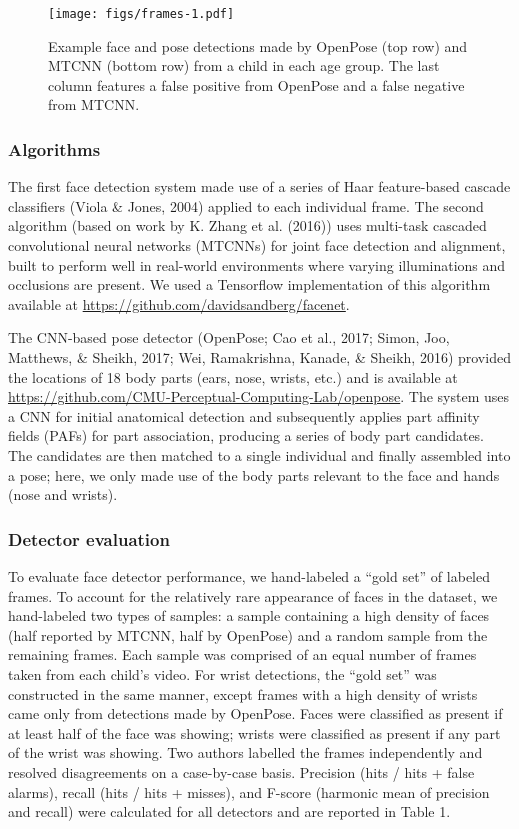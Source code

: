 \documentclass[english,man]{apa6}
\begin{document}
\begin{figure}[htbp]
\centering
\texttt{[image: figs/frames-1.pdf]}
\caption{\label{fig:frames}Example face and pose detections made by OpenPose
(top row) and MTCNN (bottom row) from a child in each age group. The
last column features a false positive from OpenPose and a false negative
from MTCNN.}
\end{figure}

\subsubsection{Algorithms}\label{algorithms}

The first face detection system made use of a series of Haar
feature-based cascade classifiers (Viola \& Jones, 2004) applied to each
individual frame. The second algorithm (based on work by K. Zhang et al.
(2016)) uses multi-task cascaded convolutional neural networks (MTCNNs)
for joint face detection and alignment, built to perform well in
real-world environments where varying illuminations and occlusions are
present. We used a Tensorflow implementation of this algorithm available
at \url{https://github.com/davidsandberg/facenet}.

The CNN-based pose detector (OpenPose; Cao et al., 2017; Simon, Joo,
Matthews, \& Sheikh, 2017; Wei, Ramakrishna, Kanade, \& Sheikh, 2016)
provided the locations of 18 body parts (ears, nose, wrists, etc.) and
is available at
\url{https://github.com/CMU-Perceptual-Computing-Lab/openpose}. The
system uses a CNN for initial anatomical detection and subsequently
applies part affinity fields (PAFs) for part association, producing a
series of body part candidates. The candidates are then matched to a
single individual and finally assembled into a pose; here, we only made
use of the body parts relevant to the face and hands (nose and wrists).

\subsubsection{Detector evaluation}\label{detector-evaluation}

To evaluate face detector performance, we hand-labeled a \enquote{gold
set} of labeled frames. To account for the relatively rare appearance of
faces in the dataset, we hand-labeled two types of samples: a sample
containing a high density of faces (half reported by MTCNN, half by
OpenPose) and a random sample from the remaining frames. Each sample was
comprised of an equal number of frames taken from each child's video.
For wrist detections, the \enquote{gold set} was constructed in the same
manner, except frames with a high density of wrists came only from
detections made by OpenPose. Faces were classified as present if at
least half of the face was showing; wrists were classified as present if
any part of the wrist was showing. Two authors labelled the frames
independently and resolved disagreements on a case-by-case basis.
Precision (hits / hits + false alarms), recall (hits / hits + misses),
and F-score (harmonic mean of precision and recall) were calculated for
all detectors and are reported in Table 1.
\end{document}
